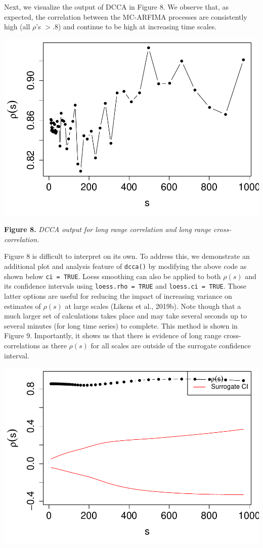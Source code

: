 \documentclass[
  man]{apa6}
\begin{document}
Next, we visualize the output of DCCA in Figure 8. We observe that, as
expected, the correlation between the MC-ARFIMA processes are
consistently high (all \(\rho\)'s \(> .8\)) and continue to be high at
increasing time scales.

\includegraphics{fractal_regression_paper_brm_files/figure-latex/unnamed-chunk-17-1.pdf}

\textbf{Figure 8.} \emph{DCCA output for long range correlation and long range
cross-correlation.}

Figure 8 is difficult to interpret on its own. To address this, we
demonstrate an additional plot and analysis feature of \texttt{dcca()} by
modifying the above code as shown below \texttt{ci\ =\ TRUE}. Loess smoothing can
also be applied to both \(\rho(s)\) and its confidence intervals using
\texttt{loess.rho\ =\ TRUE} and \texttt{loess.ci\ =\ TRUE}. Those latter options are
useful for reducing the impact of increasing variance on estimates of
\(\rho(s)\) at large scales (Likens et al., 2019b). Note though that a much larger
set of calculations takes place and may take several seconds up to
several minutes (for long time series) to complete. This method is shown
in Figure 9. Importantly, it shows us that there is evidence of long
range cross-correlations as there \(\rho(s)\) for all scales are outside
of the surrogate confidence interval.

\includegraphics{fractal_regression_paper_brm_files/figure-latex/unnamed-chunk-18-1.pdf}
\end{document}
